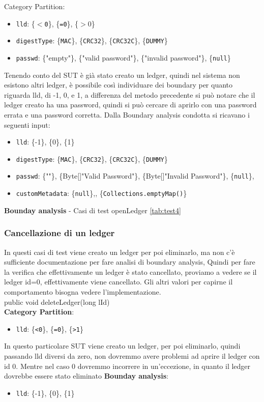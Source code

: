 \documentclass[10pt]{article}
\begin{document}
{		Category Partition: 
		\begin{itemize}[label=--, itemsep=2pt, parsep=0pt]
			\item \texttt{lld}: \{\texttt{$<$0}\}, \{\texttt{=0}\}, \{\texttt{$>0$}\}
			\item \texttt{digestType}: \{\texttt{MAC}\}, \{\texttt{CRC32}\}, \{\texttt{CRC32C}\}, \{\texttt{DUMMY}\}
			\item \texttt{passwd}: \{"empty"\}, \{"valid password"\}, \{"invalid password"\}, \{\texttt{null}\}
		\end{itemize}
		Tenendo conto del SUT è già stato creato un ledger, quindi nel sistema non esistono altri ledger, è possibile così individuare dei boundary per quanto riguarda lld, di -1, 0, e 1, 
		a differenza del metodo precedente si può notare che il ledger creato ha una password, quindi si può cercare di aprirlo con una password errata e una password corretta.
		Dalla Boundary analysis condotta si ricavano i seguenti input:
		\begin{itemize}[label=--, itemsep=2pt, parsep=0pt]
			\item \texttt{lld}: \{-1\}, \{0\}, \{1\}
			\item \texttt{digestType}: \{\texttt{MAC}\}, \{\texttt{CRC32}\}, \{\texttt{CRC32C}\}, \{\texttt{DUMMY}\}
			\item \texttt{passwd}: \{""\}, \{Byte[]"Valid Password"\}, \{Byte[]"Invalid Password"\}, \{\texttt{null}\},
			\item \texttt{customMetadata}:  \{\texttt{null}\},,  \{\texttt{Collections.emptyMap()}\}
		\end{itemize}
		\textbf{Bounday analysis}
		- Casi di test openLedger \autoref{tab:test4}
		\subsubsection{Cancellazione di un ledger}
		In questi casi di test viene creato un ledger per poi eliminarlo, ma non c'è sufficiente documentazione per fare analisi di boundary analysis, Quindi per fare la verifica che effettivamente un ledger è stato cancellato, proviamo a vedere se il ledger id=0, effettivamente viene cancellato. Gli altri valori per capirne il comportamento bisogna vedere l'implementazione.\\
		
		public void deleteLedger(long lId)\\
		\textbf{Category Partition}: 
		\begin{itemize}[label=--, itemsep=2pt, parsep=0pt]
			\item \texttt{lld}: \{\texttt{<0}\}, \{\texttt{=0}\}, \{\texttt{>1}\}
		\end{itemize}
		In questo particolare SUT viene creato un ledger, per poi eliminarlo, quindi passando lld diversi da zero,
		non dovremmo avere problemi ad aprire il ledger con id 0. Mentre nel caso 0 dovremmo incorrere in un'eccezione, in quanto il ledger dovrebbe essere stato eliminato
		\textbf{Bounday analysis}:
		\begin{itemize}[label=--, itemsep=2pt, parsep=0pt]
			\item \texttt{lld}: \{-1\}, \{0\}, \{1\}
		\end{itemize}
		
}
\end{document}
